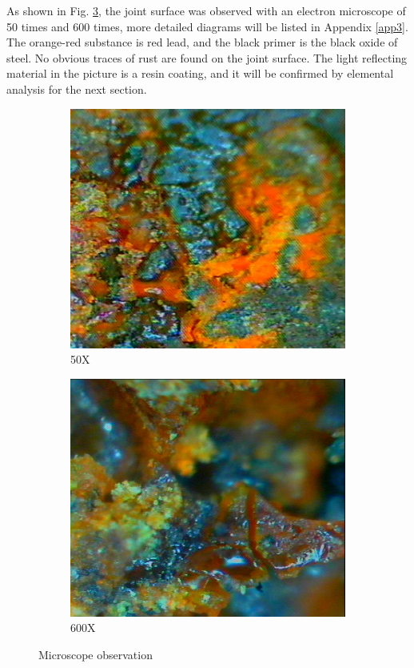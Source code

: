 As shown in Fig. \ref{ch3fig3}, the joint surface was observed with an electron microscope of 50 times and 600 times, more detailed diagrams will be listed in Appendix \ref{app3}. The orange-red substance is red lead, and the black primer is the black oxide of steel. No obvious traces of rust are found on the joint surface. The light reflecting material in the picture is a resin coating, and it will be confirmed by elemental analysis for the next section.

\begin{figure}[htbp]
    \centering
    \begin{subfigure}[t]{0.4\textwidth}
    \includegraphics[width=\linewidth]{imgs/ch3/fig3a.jpeg}
    \caption{50X}
    \label{ch3fig3a}  
    \end{subfigure}
    \hfill
    \begin{subfigure}[t]{0.4\textwidth}
    \includegraphics[width=\linewidth]{imgs/ch3/fig3b.jpeg}
    \caption{600X}
    \label{ch3fig3b}  
    \end{subfigure}
    \caption{Microscope observation}
    \label{ch3fig3}
\end{figure}

